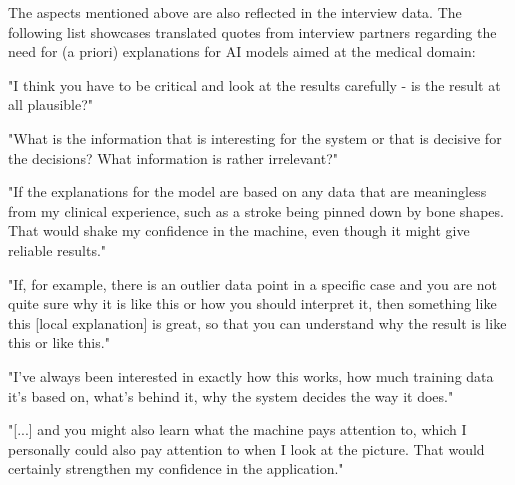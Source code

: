 \documentclass[11pt,a4paper,english]{scrreprt}
\begin{document}
The aspects mentioned above are also reflected in the interview data. The following list showcases translated quotes from interview partners regarding the need for (a priori) explanations for AI models aimed at the medical domain:
\begin{displayquote}
    "I think you have to be critical and look at the results carefully - is the result at all plausible?"
\end{displayquote}
\begin{displayquote}
    "What is the information that is interesting for the system or that is decisive for the decisions? What information is rather irrelevant?"
\end{displayquote}
\begin{displayquote}
    "If the explanations for the model are based on any data that are meaningless from my clinical experience, such as a stroke being pinned down by bone shapes. That would shake my confidence in the machine, even though it might give reliable results."
\end{displayquote}
\begin{displayquote}
    "If, for example, there is an outlier data point in a specific case and you are not quite sure why it is like this or how you should interpret it, then something like this [local explanation] is great, so that you can understand why the result is like this or like this."
\end{displayquote}
\begin{displayquote}
    "I've always been interested in exactly how this works, how much training data it's based on, what's behind it, why the system decides the way it does."
\end{displayquote}
\begin{displayquote}
    "[...] and you might also learn what the machine pays attention to, which I personally could also pay attention to when I look at the picture. That would certainly strengthen my confidence in the application."
\end{displayquote}
\end{document}
